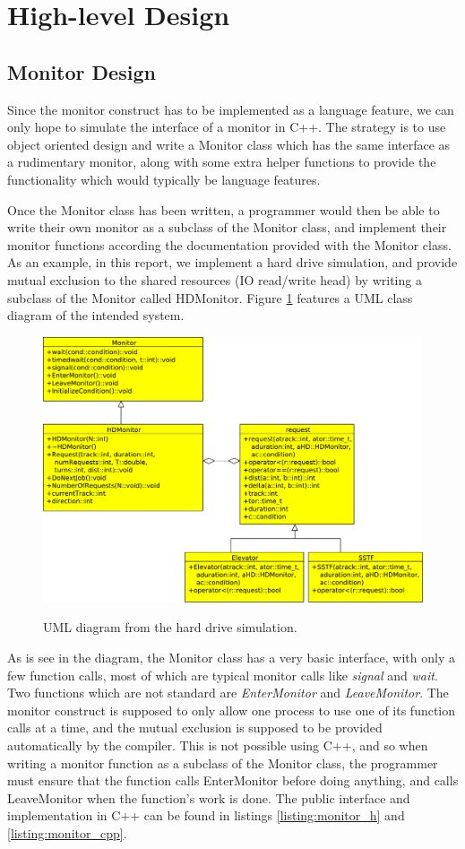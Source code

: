 \documentclass{report}
\begin{document}
\section{High-level Design} %
\subsection{Monitor Design}
Since the monitor construct has to be implemented as a language feature, we can only hope to
simulate the interface of a monitor in C++. The strategy is to use object oriented design
and write a Monitor class which has the same interface as a rudimentary monitor, along
with some extra helper functions to provide the functionality which would typically be
language features. 

Once the Monitor class has been written, a programmer would then be able to write their
own monitor as a subclass of the Monitor class, and implement their monitor functions
according the documentation provided with the Monitor class. As an example, in this
report, we implement a hard drive simulation, and provide mutual exclusion to the shared
resources (IO read/write head) by writing a subclass of the Monitor called HDMonitor.
Figure \ref{fig:UML} features a UML class diagram of the intended system.
\begin{figure}[htb!]
    \centering
    \includegraphics[scale=0.5]{300UML.pdf}
    \label{fig:UML}
    \caption{UML diagram from the hard drive simulation.}
\end{figure}

As is see in the diagram, the Monitor class has a very basic interface, with only a few
function calls, most of which are typical monitor calls like \emph{signal} and
\emph{wait}. Two functions which are not standard are \emph{EnterMonitor} and
\emph{LeaveMonitor}. The monitor construct is supposed to only allow one process to use
one of its function calls at a time, and the mutual exclusion is supposed to be provided
automatically by the compiler. This is not possible using C++, and so when writing a
monitor function as a subclass of the Monitor class, the programmer must ensure that the
function calls EnterMonitor before doing anything, and calls LeaveMonitor when the
function's work is done. The public interface and implementation in C++ can be found in
listings \ref{listing:monitor_h} and \ref{listing:monitor_cpp}.
\end{document}
